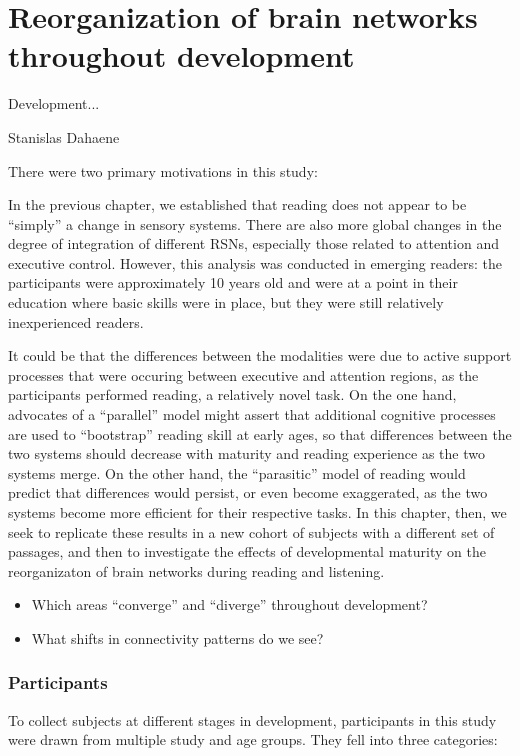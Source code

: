 \chapter{Reorganization of brain networks throughout development}

\epigraph{Development...}{Stanislas Dahaene}


There were two primary motivations in this study:

In the previous chapter, we established that reading does not appear to be ``simply'' a change in sensory systems. There are also more global changes in the degree of integration of different RSNs, especially those related to attention and executive control. However, this analysis was conducted in emerging readers: the participants were approximately 10 years old and were at a point in their education where basic skills were in place, but they were still relatively inexperienced readers.

It could be that the differences between the modalities were due to active support processes that were occuring between executive and attention regions, as the participants performed reading, a relatively novel task. On the one hand, advocates of a ``parallel'' model might assert that additional cognitive processes are used to ``bootstrap'' reading skill at early ages, so that differences between the two systems should decrease with maturity and reading experience as the two systems merge. On the other hand, the ``parasitic'' model of reading would predict that differences would persist, or even become exaggerated, as the two systems become more efficient for their respective tasks. In this chapter, then, we seek to replicate these results in a new cohort of subjects with a different set of passages, and then to investigate the effects of developmental maturity on the reorganizaton of brain networks during reading and listening.


\begin{itemize}
	\item Which areas ``converge'' and ``diverge'' throughout development?
	\item What shifts in connectivity patterns do we see?
\end{itemize} 

\subsection{Participants}

To collect subjects at different stages in development, participants in this study were drawn from multiple study and age groups. They fell into three categories:

